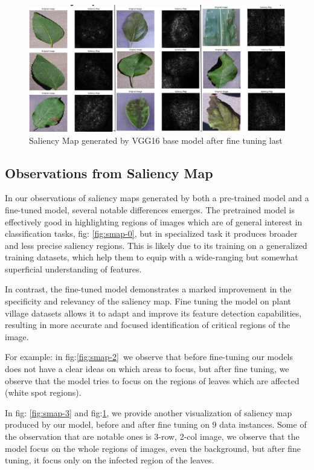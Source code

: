 \begin{figure}[h]
    \centering
    \includegraphics[width=1\textheight, angle=90, origin=c]{graphics//chapter7/vgg smap 3.png}
    \caption{Saliency Map generated by VGG16 base model after fine tuning last}
    \label{fig:smap-4}
\end{figure}
\subsection{Observations from Saliency Map}

In our observations of saliency maps generated by both a pre-trained model and a fine-tuned model, several notable differences emerges. The pretrained model is effectively good in highlighting regions of images which are of general interest in classification tasks, fig: \ref{fig:smap-0}, but in specialized task it produces broader and less precise saliency regions. This is likely due to its training on a generalized training datasets, which help them to equip with a wide-ranging but somewhat superficial understanding of features.\par\vspace{1em}
In contrast, the fine-tuned model demonstrates a marked improvement in the specificity and relevancy of the saliency map. Fine tuning the model on plant village datasets allows it to adapt and improve its feature detection capabilities, resulting in more accurate and focused identification of critical regions of the image.\par\vspace{1em}
For example: in fig:\ref{fig:smap-2}\, we observe that before fine-tuning our models does not have a clear ideas on which areas to focus, but after fine tuning, we observe that the model tries to focus on the regions of leaves which are affected (white spot regions).
\par\vspace{1em}
In fig: \ref{fig:smap-3} and fig:\ref{fig:smap-4}, we provide another visualization of saliency map produced by our model, before and after fine tuning on 9 data instances. Some of the observation that are notable ones is 3-row, 2-col image, we observe that the model focus on the whole regions of images, even the background, but after fine tuning, it focus only on  the infected region of the leaves.
\FloatBarrier